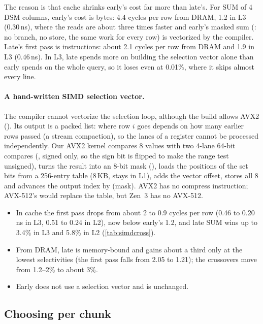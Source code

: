 The reason is that cache shrinks early's cost far more than late's. For SUM of 4 DSM columns,
early's cost is bytes: 4.4 cycles per row from DRAM, 1.2 in L3 (0.30\,ns), where the reads are
about three times faster and early's masked sum (: no branch,
no store, the same work for every row) is vectorized by the compiler. Late's first pass is
instructions: about 2.1 cycles per row from DRAM and 1.9 in L3 (0.46\,ns). In L3, late spends
more on building the selection vector alone than early spends on the whole query, so it loses
even at 0.01\%, where it skips almost every line.

\paragraph{A hand-written SIMD selection vector.} The compiler cannot vectorize the selection
loop, although the build allows AVX2 (). Its output is a packed list:
where row $i$ goes depends on how many earlier rows passed (a stream compaction), so the lanes
of a register cannot be processed independently. Our AVX2 kernel compares 8 values with two
4-lane 64-bit compares (, signed only, so the sign bit is flipped to make the
range test unsigned), turns the result into an 8-bit mask (), loads the
positions of the set bits from a 256-entry table (8\,KB, stays in L1), adds the vector offset,
stores all 8 and advances the output index by (mask). AVX2 has no compress
instruction; AVX-512's  would replace the table, but Zen~3 has no AVX-512.
\begin{itemize}
\item In cache the first pass drops from about 2 to 0.9 cycles per row (0.46 to 0.20\,ns in
L3, 0.51 to 0.24 in L2), now below early's 1.2, and late SUM wins up to 3.4\% in L3 and 5.8\%
in L2 (\cref{tab:simdcross}).
\item From DRAM, late is memory-bound and gains about a third only at the lowest
selectivities (the first pass falls from 2.05 to 1.21\ms); the crossovers move from 1.2--2\% to
about 3\%.
\item Early does not use a selection vector and is unchanged.
\end{itemize}

\subsection{Choosing per chunk}
\label{sec:mat:auto}

